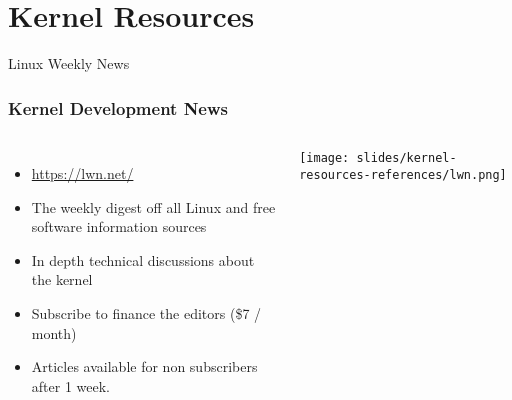 \section{Kernel Resources}

\begin{frame}
  Linux Weekly News
  \frametitle{Kernel Development News}
  \begin{columns}
    \begin{itemize}
    \item \url{https://lwn.net/}
    \item The weekly digest off all Linux and free software
      information sources
    \item In depth technical discussions about the kernel
    \item Subscribe to finance the editors (\$7 / month)
    \item Articles available for non subscribers after 1 week.
    \end{itemize}
    \texttt{[image: slides/kernel-resources-references/lwn.png]}
  \end{columns}
\end{frame}

